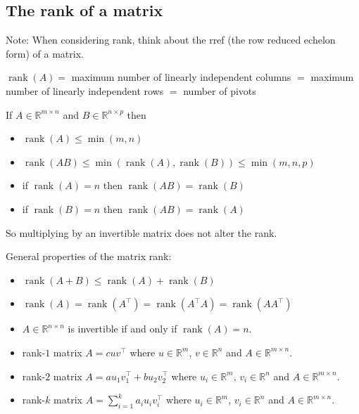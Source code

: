 \documentclass[13pt]{article}
\theoremstyle{definition}
\theoremstyle{remark}
\begin{document}
\headrule

\begin{multicols}{2}
\section{The rank of a matrix}

Note: When considering rank, think about the rref (the row reduced echelon form) of a matrix.

$\operatorname{rank}(A)=$ maximum number of linearly independent columns $=$ maximum number of linearly independent rows $=$ number of pivots

If $A \in \mathbb{R}^{m \times n}$ and $B \in \mathbb{R}^{n \times p}$ then

\begin{itemize}
  \item $\operatorname{rank}(A) \leq \min (m, n)$

  \item $\operatorname{rank}(A B) \leq \min (\operatorname{rank}(A), \operatorname{rank}(B)) \leq \min (m, n, p)$

  \item if $\operatorname{rank}(A)=n$ then $\operatorname{rank}(A B)=\operatorname{rank}(B)$

  \item if $\operatorname{rank}(B)=n$ then $\operatorname{rank}(A B)=\operatorname{rank}(A)$

\end{itemize}

So multiplying by an invertible matrix does not alter the rank.

General properties of the matrix rank:

\begin{itemize}
  \item $\operatorname{rank}(A+B) \leq \operatorname{rank}(A)+\operatorname{rank}(B)$

  \item $\operatorname{rank}(A)=\operatorname{rank}\left(A^{\top}\right)=\operatorname{rank}\left(A^{\top} A\right)=\operatorname{rank}\left(A A^{\top}\right)$

  \item $A \in \mathbb{R}^{n \times n}$ is invertible if and only if $\operatorname{rank}(A)=n$.
  \item rank-$1$ matrix $A = cuv^\top$ where $u\in\mathbb{R}^m$, $v\in\mathbb{R}^n$ and $A\in\mathbb{R}^{m\times n}$.
  \item rank-$2$ matrix $A = au_1v_1^\top + bu_2v_2^\top$ where $u_i\in\mathbb{R}^m$, $v_i\in\mathbb{R}^n$ and $A\in\mathbb{R}^{m\times n}$.
  \item rank-$k$ matrix $A = \sum_{i=1}^k a_iu_iv_i^\top$ where $u_i\in\mathbb{R}^m$, $v_i\in\mathbb{R}^n$ and $A\in\mathbb{R}^{m\times n}$.
\end{itemize}


\end{multicols}
\end{document}
